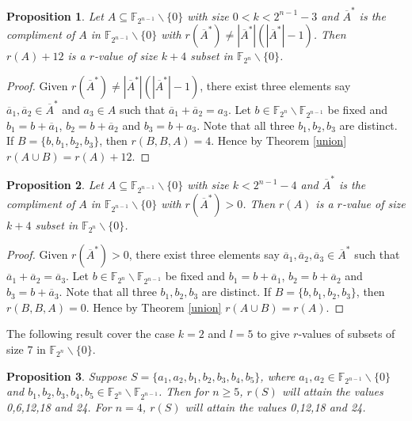 \documentclass[12pt,a4paper]{article}
\newtheorem{prop}{Proposition}[section]
\begin{document}
	\begin{prop}\label{4-12}
		Let $A\subseteq\mathbb{F}_{2^{n-1}}\backslash\{0\}$ with size $0<k<2^{n-1}-3$ and $\overline{A}^*$ is the compliment of $A$ in $\mathbb{F}_{2^{n-1}}\backslash\{0\}$ with $r(\overline{A}^*)\neq|\overline{A}^*|(|\overline{A}^*|-1)$. Then $r(A)+12$ is a $r$-value of size $k+4$ subset in $\mathbb{F}_{2^{n}}\backslash\{0\}$.
	\end{prop}
	\begin{proof}
		
		Given $r(\overline{A}^*)\neq|\overline{A}^*|(|\overline{A}^*|-1)$, there exist three elements say $\overline{a}_1, \overline{a}_2 \in \overline{A}^*$ and $a_3\in A$ such that $\overline{a}_1+\overline{a}_2=a_3$. Let $b\in\mathbb{F}_{2^n}\backslash\mathbb{F}_{2^{n-1}}$ be fixed and $b_1=b+\overline{a}_1$, $b_2=b+\overline{a}_2$ and $b_3=b+a_3$. Note that all three $b_1,b_2,b_3$ are distinct. If $B=\{b,b_1,b_2,b_3\}$, then $r(B,B,A)=4$. Hence by Theorem \ref{union} $r(A\cup B)=r(A)+12$.
	\end{proof}
	\begin{prop}\label{4-0}
		Let $A\subseteq\mathbb{F}_{2^{n-1}}\backslash\{0\}$ with size $k<2^{n-1}-4$ and $\overline{A}^*$ is the compliment of $A$ in $\mathbb{F}_{2^{n-1}}\backslash\{0\}$ with $r(\overline{A}^*)>0$. Then $r(A)$ is a $r$-value of size $k+4$ subset in $\mathbb{F}_{2^{n}}\backslash\{0\}$.
	\end{prop}
	\begin{proof}
		Given $r(\overline{A}^*)>0$, there exist three elements say $\overline{a}_1,\overline{a}_2,\overline{a}_3\in \overline{A}^*$ such that $\overline{a}_1+\overline{a}_2=\overline{a}_3$. Let $b\in\mathbb{F}_{2^n}\backslash\mathbb{F}_{2^{n-1}}$ be fixed and $b_1=b+\overline{a}_1$, $b_2=b+\overline{a}_2$ and $b_3=b+\overline{a}_3$. Note that all three $b_1,b_2,b_3$ are distinct. If $B=\{b,b_1,b_2,b_3\}$, then $r(B,B,A)=0$. Hence by Theorem \ref{union} $r(A\cup B)=r(A)$.
	\end{proof}
	The following result cover the case $k=2$ and $l=5$ to give $r$-values of subsets of size 7 in $\mathbb{F}_{2^n}\backslash\{0\}$.
	\begin{prop}\label{2+5}
		Suppose $S=\{a_1,a_2,b_1,b_2,b_3,b_4,b_5\}$, where $a_1,a_2\in \mathbb{F}_{2^{n-1}}\backslash\{0\}$ and $b_1,b_2,b_3,b_4,b_5\in \mathbb{F}_{2^n}\backslash\mathbb{F}_{2^{n-1}}$.  Then for $n\geq 5$, $r(S)$ will attain the values 0,6,12,18 and 24. For $n=4$, $r(S)$ will attain the values 0,12,18 and 24.
	\end{prop}
	
\end{document}

